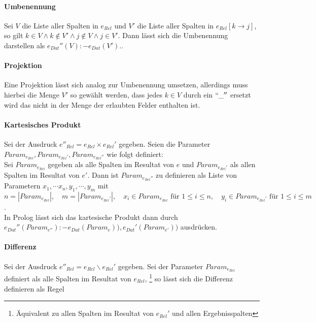\documentclass[12pt,a4paper]{amsart}
\begin{document}
\begin{aufgabe1}
\paragraph{\textbf{Umbenennung}}
Sei $V$ die Liste aller Spalten in $e_{Rel}$ und $V'$ die Liste aller Spalten in $e_{Rel}[k \rightarrow j]$, so gilt $k \in V \wedge k \not \in V' \wedge j \not \in V \wedge j \in V'$. Dann lässt sich die Umbenennung darstellen als $e_{Dat}''(V) :- e_{Dat}(V').$. \\

\paragraph{\textbf{Projektion}}
Eine Projektion lässt sich analog zur Umbenennung umsetzen, allerdings muss hierbei die Menge $V'$ so gewählt werden, dass jedes $k \in V$ durch ein $``\_''$ ersetzt wird das nicht in der Menge der erlaubten Felder enthalten ist. \\

\paragraph{\textbf{Kartesisches Produkt}}
Sei der Ausdruck $e''_{Rel} = e_{Rel} \times e_{Rel}'$ gegeben. 
Seien die Parameter $Param_{e_{Rel}}, Param_{e_{Rel}'}, Param_{e_{Rel}''}$ wie folgt definiert: \\
Sei $Param_{e_{Rel}}$ gegeben als alle Spalten im Resultat von $e$ und $Param_{e_{Rel}'}$ als allen Spalten im Resultat von $e'$. Dann ist $Param_{e_{Rel}''}$ zu definieren als Liste von Parametern $x_1, \cdots x_n, y_1, \cdots, y_m$ mit $n = |Param_{e_{Rel}}|, \quad m = |Param_{e_{Rel}'}|, \quad x_i \in Param_{e_{Rel}} \text { für } 1 \le i \le n, \quad y_i \in Param_{e_{Rel}'} \text { für } 1 \le i \le m$. \\
In Prolog lässt sich das kartesische Produkt dann durch \\ $e_{Dat}''(Param_{e''}) :- e_{Dat}(Param_{e})), e_{Dat}'(Param_{e'}))$ ausdrücken. \\

\paragraph{\textbf{Differenz}}
Sei der Ausdruck $e''_{Rel} = e_{Rel} \backslash e_{Rel}'$ gegeben. Sei der Parameter $Param_{e_{Rel}}$ definiert als alle Spalten im Resultat von $e_{Rel}$, \footnote{Äquivalent zu allen Spalten im Resultat von $e_{Rel}'$ und allen Ergebnisspalten} so lässt sich die Differenz definieren als Regel \\


\end{aufgabe1}
\end{document}
